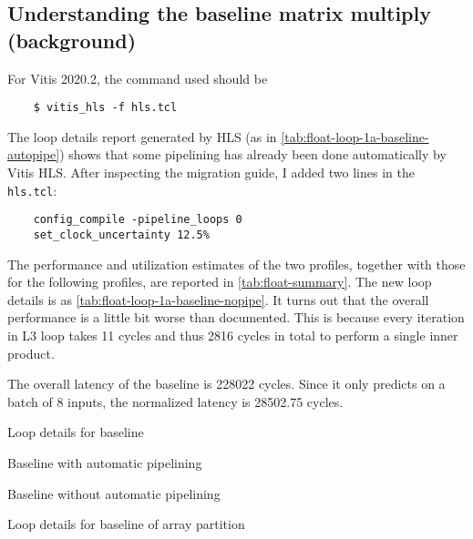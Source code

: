 \subsection{Understanding the baseline matrix multiply (background)}\label{sec:1a}

For Vitis 2020.2, the command used should be
\begin{verbatim}
    $ vitis_hls -f hls.tcl
\end{verbatim}
The loop details report generated by HLS (as in \autoref{tab:float-loop-1a-baseline-autopipe}) shows that some pipelining has already been done automatically by Vitis HLS.
After inspecting the migration guide, I added two lines in the \texttt{hls.tcl}:
\begin{verbatim}
    config_compile -pipeline_loops 0
    set_clock_uncertainty 12.5%
\end{verbatim}

The performance and utilization estimates of the two profiles, together with those for the following profiles, are reported in \autoref{tab:float-summary}.
The new loop details is as \autoref{tab:float-loop-1a-baseline-nopipe}.
It turns out that the overall performance is a little bit worse than documented.
This is because every iteration in L3 loop takes 11 cycles and thus
2816 cycles in total to perform a single inner product.

The overall latency of the baseline is 228022 cycles.
Since it only predicts on a batch of 8 inputs, the normalized latency is 28502.75 cycles.

\begin{table}[ht!]

    \caption{Loop details for baseline}

    \begin{subtable}{\textwidth}
        \caption{Baseline with automatic pipelining}
        \label{tab:float-loop-1a-baseline-autopipe}
        \centering
        
    \end{subtable}

    \begin{subtable}{\textwidth}
        \caption{Baseline without automatic pipelining}
        \label{tab:float-loop-1a-baseline-nopipe}
        \centering
        
    \end{subtable}

\end{table}


\begin{table}[ht!]
    \caption{Loop details for baseline of array partition}
    \label{tab:float-loop-1c0-baseline-ap-l2}
    \centering
    
\end{table}